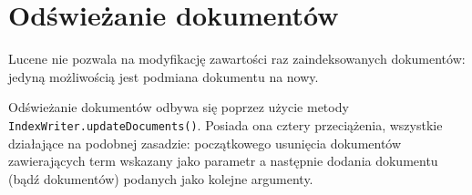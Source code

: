 \section{Odświeżanie dokumentów}

Lucene nie pozwala na modyfikację zawartości raz zaindeksowanych dokumentów: jedyną możliwością jest podmiana dokumentu na nowy.

Odświeżanie dokumentów odbywa się poprzez użycie metody \texttt{IndexWriter.updateDocuments()}. Posiada ona cztery przeciążenia, wszystkie działające na podobnej zasadzie: początkowego usunięcia dokumentów zawierających term wskazany jako parametr a następnie dodania dokumentu (bądź dokumentów) podanych jako kolejne argumenty. 
